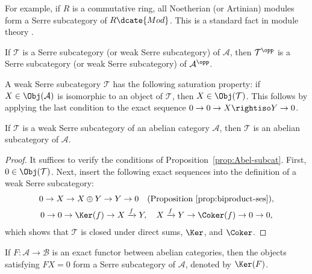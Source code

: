 For example, if $R$ is a commutative ring, all Noetherian (or Artinian)
modules form a Serre subcategory of $R\dcate{Mod}$. This is a standard fact in
module theory \cite[Lemma 6.10.2]{Li1}.

If $\mathcal{T}$ is a Serre subcategory (or weak Serre subcategory) of
$\mathcal{A}$, then $\mathcal{T}^{\opp}$ is a Serre subcategory (or weak
Serre subcategory) of $\mathcal{A}^{\opp}$.

A weak Serre subcategory $\mathcal{T}$ has the following saturation property:
if $X\in\Obj(\mathcal{A})$ is isomorphic to an object of $\mathcal{T}$, then
$X\in\Obj(\mathcal{T})$. This follows by applying the last condition to the
exact sequence $0\to0\to X\rightiso Y\to0$.

\begin{corollary}\label{prop:Serre-subcat-abelian}
If $\mathcal{T}$ is a weak Serre subcategory of an abelian category
$\mathcal{A}$, then $\mathcal{T}$ is an abelian subcategory of $\mathcal{A}$.
\end{corollary}

\begin{proof}
It suffices to verify the conditions of Proposition~\ref{prop:Abel-subcat}.
First, $0\in\Obj(\mathcal{T})$. Next, insert the following exact sequences
into the definition of a weak Serre subcategory:
\begin{gather*}
	0\to X\to X\oplus Y\to Y\to0
	\quad\text{(Proposition~\ref{prop:biproduct-ses})},\\
	0\to0\to\Ker(f)\to X\xrightarrow{f}Y,\quad
	X\xrightarrow{f}Y\to\Coker(f)\to0\to0,
\end{gather*}
which shows that $\mathcal{T}$ is closed under direct sums, $\Ker$, and
$\Coker$.
\end{proof}

\begin{example}
If $F:\mathcal{A}\to\mathcal{B}$ is an exact functor between abelian
categories, then the objects satisfying $FX=0$ form a Serre subcategory of
$\mathcal{A}$, denoted by $\Ker(F)$.
\end{example}

